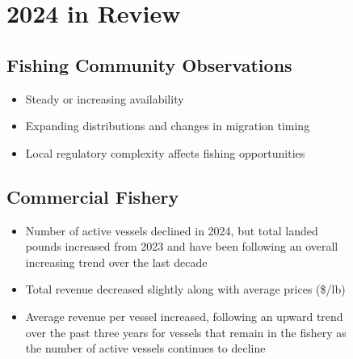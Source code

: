 \documentclass[
  10pt,
  letterpaper,
  DIV=11,
  numbers=noendperiod]{scrartcl}
\providecommand{\tightlist}{%
  \setlength{\itemsep}{0pt}\setlength{\parskip}{0pt}}\usepackage{longtable,booktabs,array}
\begin{document}
\begin{figure}

\begin{minipage}[t]{0.40\linewidth}

{\centering 


}

\end{minipage}%
%
\begin{minipage}[t]{0.03\linewidth}

{\centering 

\hfill

}

\end{minipage}%
%
\begin{minipage}[t]{0.57\linewidth}

{\centering 

\section{2024 in Review}

\subsection{Fishing Community Observations}

\begin{itemize}
\tightlist
\item
  Steady or increasing availability
\item
  Expanding distributions and changes in migration timing
\item
  Local regulatory complexity affects fishing opportunities
\end{itemize}

\subsection{Commercial Fishery}

\begin{itemize}
\tightlist
\item
  Number of active vessels declined in 2024, but total landed pounds
  increased from 2023 and have been following an overall increasing
  trend over the last decade
\item
  Total revenue decreased slightly along with average prices (\$/lb)
\item
  Average revenue per vessel increased, following an upward trend over
  the past three years for vessels that remain in the fishery as the
  number of active vessels continues to decline
\end{itemize}

}
\end{minipage}
\end{figure}
\end{document}
